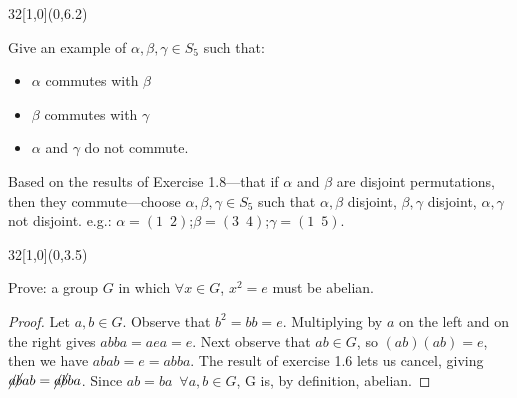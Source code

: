 \documentclass[12pt]{article}
\newenvironment{exercise}[2]{\begin{textblock}{32}[1,0](0,#2)\noindent#1\end{textblock}}{\vspace{1in}}
\begin{document}
%

\begin{exercise}{1.18}{6.2}
	{\noindent}Give an example of $\alpha, \beta, \gamma\in S_5$ such that:
	\begin{itemize}
		\item $\alpha$ commutes with $\beta$
		\item $\beta$ commutes with $\gamma$
		\item $\alpha$ and $\gamma$ do not commute.
	\end{itemize}
	\bigskip
	Based on the results of Exercise 1.8---that if $\alpha$ and $\beta$ are disjoint permutations,
	then they commute---choose $\alpha, \beta, \gamma\in S_5$ such that $\alpha, \beta$ disjoint,
	$\beta, \gamma$ disjoint, $\alpha, \gamma$ not disjoint. e.g.:
	$\alpha = (1\enspace2)$;\quad $\beta = (3\enspace4)$;\quad $\gamma = (1\enspace5)$.
\end{exercise}

%


\begin{exercise}{1.26}{3.5}
	{\noindent}Prove: a group $G$ in which $\forall x\in G$, $x^2=e$ must be abelian.
	\bigskip

	\begin{proof}
		Let $a, b\in G$. Observe that $b^2 = bb = e$. Multiplying by $a$ on the left and on the right gives
		$abba = aea = e$. Next observe that $ab\in G$, so $(ab)(ab) = e$, then we have $abab = e = abba$. The result of
		exercise 1.6 lets us cancel, giving $\cancel{a}\cancel{b}ab = \cancel{a}\cancel{b}ba$. Since $ab = ba\enspace
		\forall a, b \in G$, G is, by definition, abelian.
	\end{proof}
\end{exercise}
\end{document}

